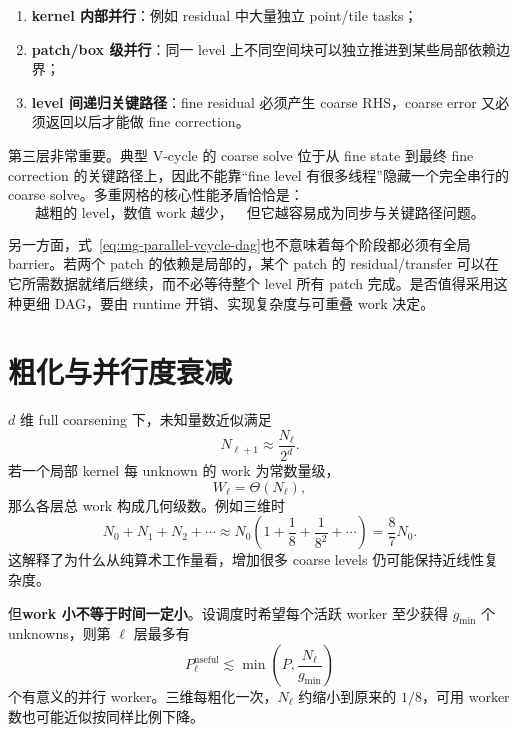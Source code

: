 \begin{enumerate}
\item \textbf{kernel 内部并行}：例如 residual 中大量独立 point/tile tasks；
\item \textbf{patch/box 级并行}：同一 level 上不同空间块可以独立推进到某些局部依赖边界；
\item \textbf{level 间递归关键路径}：fine residual 必须产生 coarse RHS，coarse error 又必须返回以后才能做 fine correction。
\end{enumerate}

第三层非常重要。典型 V-cycle 的 coarse solve 位于从 fine state 到最终 fine correction 的关键路径上，因此不能靠“fine level 有很多线程”隐藏一个完全串行的 coarse solve。多重网格的核心性能矛盾恰恰是：
\begin{equation}
\boxed{
\text{越粗的 level，数值 work 越少，}
\quad
\text{但它越容易成为同步与关键路径问题。}
}
\label{eq:mg-coarse-paradox}
\end{equation}

另一方面，式~\eqref{eq:mg-parallel-vcycle-dag}也不意味着每个阶段都必须有全局 barrier。若两个 patch 的依赖是局部的，某个 patch 的 residual/transfer 可以在它所需数据就绪后继续，而不必等待整个 level 所有 patch 完成。是否值得采用这种更细 DAG，要由 runtime 开销、实现复杂度与可重叠 work 决定。

\section{粗化与并行度衰减}

$d$ 维 full coarsening 下，未知量数近似满足
\begin{equation}
N_{\ell+1}
\approx
\frac{N_\ell}{2^d}.
\label{eq:mg-parallel-coarsening-count}
\end{equation}
若一个局部 kernel 每 unknown 的 work 为常数量级，
\begin{equation}
W_\ell=\Theta(N_\ell),
\end{equation}
那么各层总 work 构成几何级数。例如三维时
\begin{equation}
N_0+N_1+N_2+\cdots
\approx
N_0
\left(
1+\frac18+\frac1{8^2}+\cdots
\right)
=
\frac87 N_0.
\end{equation}
这解释了为什么从纯算术工作量看，增加很多 coarse levels 仍可能保持近线性复杂度。

但\textbf{work 小不等于时间一定小}。设调度时希望每个活跃 worker 至少获得 $g_{\min}$ 个 unknowns，则第 $\ell$ 层最多有
\begin{equation}
P_\ell^{\mathrm{useful}}
\lesssim
\min\left(
P,
\frac{N_\ell}{g_{\min}}
\right)
\label{eq:mg-useful-workers}
\end{equation}
个有意义的并行 worker。三维每粗化一次，$N_\ell$ 约缩小到原来的 $1/8$，可用 worker 数也可能近似按同样比例下降。

